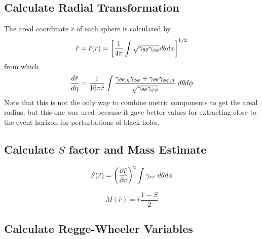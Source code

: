 \subsection{Calculate Radial Transformation}

The areal coordinate $\hat{r}$ of each sphere is calculated by
%
\begin{equation}
  \hat{r}    =  \hat{r}(r) = \left[
            \frac{1}{4\pi}
            \int\sqrt{\gamma_{\theta\theta}
            \gamma_{\phi\phi}}d\theta d\phi \right]^{1/2}
\end{equation}
%
from which
%
\begin{equation}
\frac{d\hat{r}}{d\eta} = \frac{1}{16\pi \hat{r}}
  \int\frac{\gamma_{\theta\theta,\eta}\gamma_{\phi\phi}+\gamma_{\theta\theta}\gamma_{\phi\phi,\eta}}
  {\sqrt{\gamma_{\theta\theta}\gamma_{\phi\phi}}} \ d\theta d\phi
\end{equation}
%
Note that this is not the only way to combine metric components to get
the areal radius, but this one was used because it gave better values
for extracting close to the event horizon for perturbations of black
holes.

\subsection{Calculate $S$ factor and Mass Estimate}

\begin{equation}
S(\hat{r}) = \left(\frac{\partial\hat{r}}{\partial r}\right)^2 \int \gamma_{rr} \ d\theta d\phi
\end{equation}

\begin{equation}
M(\hat{r}) = \hat{r}\frac{1-S}{2}
\end{equation}

\subsection{Calculate Regge-Wheeler Variables}

